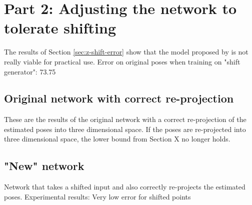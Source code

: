\section{Part 2: Adjusting the network to tolerate shifting}
\label{sec:network-adjusting}

The results of Section \ref{sec:z-shift-error} show that the model proposed by \citet{drover18} is not really viable for practical use.
Error on original poses when training on "shift generator": 73.75
\subsection{Original network with correct re-projection}
These are the results of the original network with a correct re-projection of the estimated poses into three dimensional space.
If the poses are re-projected into three dimensional space, the lower bound from Section X no longer holds.

\subsection{"New" network}
Network that takes a shifted input and also correctly re-projects the estimated poses.
Experimental results: Very low error for shifted points